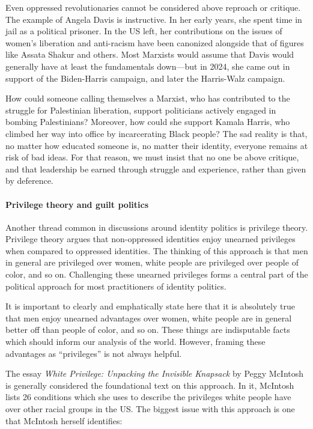 Even oppressed revolutionaries cannot be considered above reproach or critique. The example of Angela Davis is instructive. In her early years, she spent time in jail as a political prisoner. In the US left, her contributions on the issues of women's liberation and anti-racism have been canonized alongside that of figures like Assata Shakur and others. Most Marxists would assume that Davis would generally have at least the fundamentals down---but in 2024, she came out in support of the Biden-Harris campaign, and later the Harris-Walz campaign.

How could someone calling themselves a Marxist, who has contributed to the struggle for Palestinian liberation, support politicians actively engaged in bombing Palestinians? Moreover, how could she support Kamala Harris, who climbed her way into office by incarcerating Black people? The sad reality is that, no matter how educated someone is, no matter their identity, everyone remains at risk of bad ideas. For that reason, we must insist that no one be above critique, and that leadership be earned through struggle and experience, rather than given by deference.

\paragraph{Privilege theory and guilt politics}

Another thread common in discussions around identity politics is privilege theory. Privilege theory argues that non-oppressed identities enjoy unearned privileges when compared to oppressed identities. The thinking of this approach is that men in general are privileged over women, white people are privileged over people of color, and so on. Challenging these unearned privileges forms a central part of the political approach for most practitioners of identity politics.

It is important to clearly and emphatically state here that it is absolutely true that men enjoy unearned advantages over women, white people are in general better off than people of color, and so on. These things are indisputable facts which should inform our analysis of the world. However, framing these advantages as ``privileges'' is not always helpful.

The essay \emph{White Privilege: Unpacking the Invisible Knapsack} by Peggy McIntosh is generally considered the foundational text on this approach. In it, McIntosh lists 26 conditions which she uses to describe the privileges white people have over other racial groups in the US. The biggest issue with this approach is one that McIntosh herself identifies:

